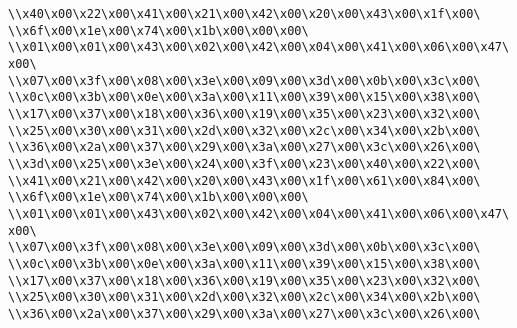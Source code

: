 \verb|\\x40\x00\x22\x00\x41\x00\x21\x00\x42\x00\x20\x00\x43\x00\x1f\x00\|\newline
\verb|\\x6f\x00\x1e\x00\x74\x00\x1b\x00\x00\x00\|\newline
\verb|\\x01\x00\x01\x00\x43\x00\x02\x00\x42\x00\x04\x00\x41\x00\x06\x00\x47\x00\|\newline
\verb|\\x07\x00\x3f\x00\x08\x00\x3e\x00\x09\x00\x3d\x00\x0b\x00\x3c\x00\|\newline
\verb|\\x0c\x00\x3b\x00\x0e\x00\x3a\x00\x11\x00\x39\x00\x15\x00\x38\x00\|\newline
\verb|\\x17\x00\x37\x00\x18\x00\x36\x00\x19\x00\x35\x00\x23\x00\x32\x00\|\newline
\verb|\\x25\x00\x30\x00\x31\x00\x2d\x00\x32\x00\x2c\x00\x34\x00\x2b\x00\|\newline
\verb|\\x36\x00\x2a\x00\x37\x00\x29\x00\x3a\x00\x27\x00\x3c\x00\x26\x00\|\newline
\verb|\\x3d\x00\x25\x00\x3e\x00\x24\x00\x3f\x00\x23\x00\x40\x00\x22\x00\|\newline
\verb|\\x41\x00\x21\x00\x42\x00\x20\x00\x43\x00\x1f\x00\x61\x00\x84\x00\|\newline
\verb|\\x6f\x00\x1e\x00\x74\x00\x1b\x00\x00\x00\|\newline
\verb|\\x01\x00\x01\x00\x43\x00\x02\x00\x42\x00\x04\x00\x41\x00\x06\x00\x47\x00\|\newline
\verb|\\x07\x00\x3f\x00\x08\x00\x3e\x00\x09\x00\x3d\x00\x0b\x00\x3c\x00\|\newline
\verb|\\x0c\x00\x3b\x00\x0e\x00\x3a\x00\x11\x00\x39\x00\x15\x00\x38\x00\|\newline
\verb|\\x17\x00\x37\x00\x18\x00\x36\x00\x19\x00\x35\x00\x23\x00\x32\x00\|\newline
\verb|\\x25\x00\x30\x00\x31\x00\x2d\x00\x32\x00\x2c\x00\x34\x00\x2b\x00\|\newline
\verb|\\x36\x00\x2a\x00\x37\x00\x29\x00\x3a\x00\x27\x00\x3c\x00\x26\x00\|\newline
